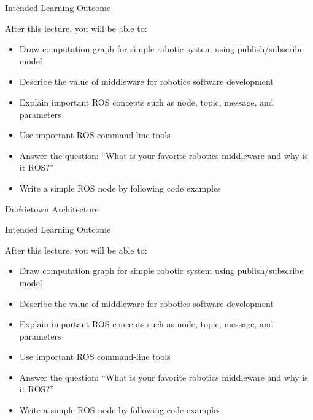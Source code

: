 \documentclass[aspectratio=43]{beamer}
\begin{document}
\begin{frame}{Intended Learning Outcome}
	\begin{block}{After this lecture, you will be able to:}
		\begin{itemize}
			\item<1> Draw computation graph for simple robotic system using publish/subscribe model
			\item<0> Describe the value of middleware for robotics software development
			\item<0> Explain important ROS concepts such as node, topic, message, and parameters
			\item<0> Use important ROS command-line tools
			\item<0> Answer the question: ``What is your favorite robotics middleware and why is it ROS?''
			\item<0> Write a simple ROS node by following code examples
		\end{itemize}
	\end{block}
\end{frame}

\begin{frame}{Duckietown Architecture}
\begin{center}
\end{center}
\end{frame}

\begin{frame}{Intended Learning Outcome}
	\begin{block}{After this lecture, you will be able to:}
		\begin{itemize}
			\item<0> Draw computation graph for simple robotic system using publish/subscribe model
			\item<1> Describe the value of middleware for robotics software development
			\item<0> Explain important ROS concepts such as node, topic, message, and parameters
			\item<0> Use important ROS command-line tools
			\item<0> Answer the question: ``What is your favorite robotics middleware and why is it ROS?''
			\item<0> Write a simple ROS node by following code examples
		\end{itemize}
	\end{block}
\end{frame}
\end{document}
